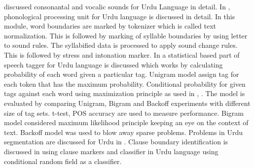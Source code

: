 

\cite{saleem2002urdu} discussed consonantal and vocalic sounds for Urdu Language in detail. In \cite{hussain2005phonological}, phonological processing unit for Urdu language is discussed in detail. In this module, word boundaries are marked by tokenizer which is called text normalization. This is followed by marking of syllable boundaries by using letter to sound rules. The syllabified data is processed to apply sound change rules. This is followed by stress and intonation marker. In \cite{anwar2007statistical} a statistical based part of speech tagger for Urdu language is discussed which works by calculating probability of each word given a particular tag. Unigram model assign tag for each token that has the maximum probability. Conditional probability for given tags against each word using maximization principle as used in \cite{bird2007introduction}, \cite{carlberger1999implementing}. The model is evaluated by comparing Unigram, Bigram and Backoff experiments with different size of tag sets. t-test, POS accuracy are used to measure performance. Bigram model considered maximum likelihood principle keeping an eye on the context of text. Backoff model was used to blow away sparse problems. Problems in Urdu segmentation are discussed for Urdu in \cite{durrani2010urdu}. Clause boundary identification is discussed in \cite{parveen2011clause} using clause markers and classifier in Urdu language using conditional random field as a classifier.

